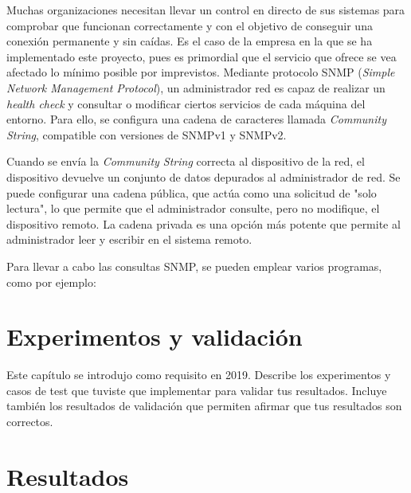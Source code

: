 \documentclass[a4paper, 12pt]{book}
\begin{document}
Muchas organizaciones necesitan llevar un control en directo de sus sistemas para comprobar que funcionan correctamente y con el objetivo de conseguir una conexión permanente y sin caídas. Es el caso de la empresa en la que se ha implementado este proyecto, pues es primordial que el servicio que ofrece se vea afectado lo mínimo posible por imprevistos. Mediante protocolo SNMP (\emph{Simple Network Management Protocol}), un administrador red es capaz de realizar un \emph{health check} y consultar o modificar ciertos servicios de cada máquina del entorno. Para ello, se configura una cadena de caracteres llamada \emph{Community String}, compatible con versiones de SNMPv1 y SNMPv2.

Cuando se envía la \emph{Community String} correcta al dispositivo de la red, el dispositivo devuelve un conjunto de datos depurados al administrador de red. Se puede configurar una cadena pública, que actúa como una solicitud de "solo lectura", lo que permite que el administrador consulte, pero no modifique, el dispositivo remoto. La cadena privada es una opción más potente que permite al administrador leer y escribir en el sistema remoto.

Para llevar a cabo las consultas SNMP, se pueden emplear varios programas, como por ejemplo:


\cleardoublepage
\chapter{Experimentos y validación}

Este capítulo se introdujo como requisito en 2019.
Describe los experimentos y casos de test que tuviste que implementar para validar tus resultados.
Incluye también los resultados de validación que permiten afirmar que tus resultados son correctos.



\cleardoublepage
\chapter{Resultados}
\end{document}
